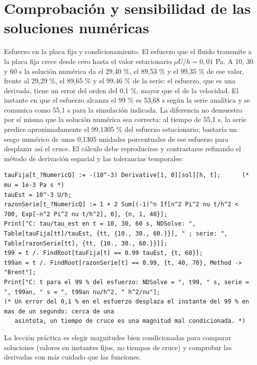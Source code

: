 \documentclass[10pt,openany]{book}
\begin{document}
\section{Comprobación y sensibilidad de las soluciones numéricas}

Esfuerzo en la placa fija y condicionamiento. El esfuerzo que el fluido transmite a la placa fija crece desde cero hasta el valor estacionario \(\mu U/h = 0{,}01\) Pa. A 10, 30 y 60 s la solución numérica da el 29,40 \%, el 89,53 \% y el 99,35 \% de ese valor, frente al 29,29 \%, el 89,65 \% y el 99,46 \% de la serie: el esfuerzo, que es una derivada, tiene un error del orden del 0,1 \%, mayor que el de la velocidad. El instante en que el esfuerzo alcanza el 99 \% es 53,68 s según la serie analítica y se comunica como 55,1 s para la simulación indicada. La diferencia no demuestra por sí misma que la solución numérica sea correcta: al tiempo de 55,1 s, la serie predice aproximadamente el 99,1305 \% del esfuerzo estacionario; bastaría un sesgo numérico de unas 0,1305 unidades porcentuales de ese esfuerzo para desplazar así el cruce. El cálculo debe reproducirse y contrastarse refinando el método de derivación espacial y las tolerancias temporales:
\begin{lstlisting}[style=studium]
tauFija[t_?NumericQ] := -(10^-3) Derivative[1, 0][sol][h, t];      (* mu = 1e-3 Pa s *)
tauEst = 10^-3 U/h;
razonSerie[t_?NumericQ] := 1 + 2 Sum[(-1)^n If[n^2 Pi^2 nu t/h^2 < 700, Exp[-n^2 Pi^2 nu t/h^2], 0], {n, 1, 40}];
Print["C: tau/tau_est en t = 10, 30, 60 s, NDSolve: ", Table[tauFija[tt]/tauEst, {tt, {10., 30., 60.}}], " ; serie: ", Table[razonSerie[tt], {tt, {10., 30., 60.}}]];
t99 = t /. FindRoot[tauFija[t] == 0.99 tauEst, {t, 60}];
t99an = t /. FindRoot[razonSerie[t] == 0.99, {t, 40, 70}, Method -> "Brent"];
Print["C: t para el 99 % del esfuerzo: NDSolve = ", t99, " s, serie = ", t99an, " s = ", t99an nu/h^2, " h^2/nu"];
(* Un error del 0,1 % en el esfuerzo desplaza el instante del 99 % en mas de un segundo: cerca de una
   asintota, un tiempo de cruce es una magnitud mal condicionada. *)
\end{lstlisting}
La lección práctica es elegir magnitudes bien condicionadas para comparar soluciones (valores en instantes fijos, no tiempos de cruce) y comprobar las derivadas con más cuidado que las funciones.
\end{document}
